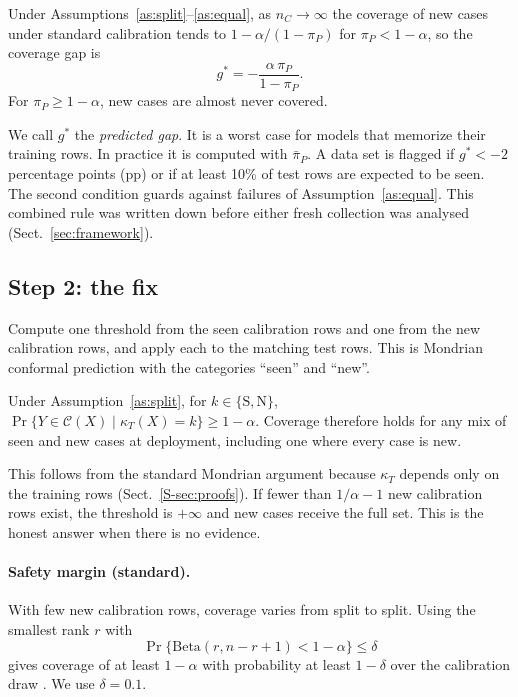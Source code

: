\begin{proposition}\label{prop:gstar}
Under Assumptions~\ref{as:split}--\ref{as:equal}, as $n_C\to\infty$ the coverage of new cases under standard calibration tends to $1-\alpha/(1-\pi_P)$ for $\pi_P<1-\alpha$, so the coverage gap is
\begin{equation}
g^*=-\frac{\alpha\,\pi_P}{1-\pi_P}.\label{eq:gstar}
\end{equation}
For $\pi_P\ge 1-\alpha$, new cases are almost never covered.
\end{proposition}
We call $g^*$ the \emph{predicted gap}. It is a worst case for models that memorize their training rows. In practice it is computed with $\bar\pi_P$. A data set is flagged if $g^*<-2$ percentage points (pp) or if at least 10\% of test rows are expected to be seen. The second condition guards against failures of Assumption~\ref{as:equal}. This combined rule was written down before either fresh collection was analysed (Sect.~\ref{sec:framework}).

\subsection{Step 2: the fix}\label{sec:fix}
Compute one threshold from the seen calibration rows and one from the new calibration rows, and apply each to the matching test rows. This is Mondrian conformal prediction \citep{vovk2022} with the categories ``seen'' and ``new''.

\begin{proposition}\label{prop:mondrian}
Under Assumption~\ref{as:split}, for $k\in\{\mathrm S,\mathrm N\}$, $\Pr\{Y\in\mathcal C(X)\mid \kappa_T(X)=k\}\ge 1-\alpha$. Coverage therefore holds for any mix of seen and new cases at deployment, including one where every case is new.
\end{proposition}
This follows from the standard Mondrian argument because $\kappa_T$ depends only on the training rows (Sect.~\ref{S-sec:proofs}). If fewer than $1/\alpha-1$ new calibration rows exist, the threshold is $+\infty$ and new cases receive the full set. This is the honest answer when there is no evidence.

\paragraph{Safety margin (standard).} With few new calibration rows, coverage varies from split to split. Using the smallest rank $r$ with
\begin{equation}
\Pr\{\mathrm{Beta}(r,n-r+1)<1-\alpha\}\le\delta\label{eq:pac}
\end{equation}
gives coverage of at least $1-\alpha$ with probability at least $1-\delta$ over the calibration draw \citep{vovk2012}. We use $\delta=0.1$.

